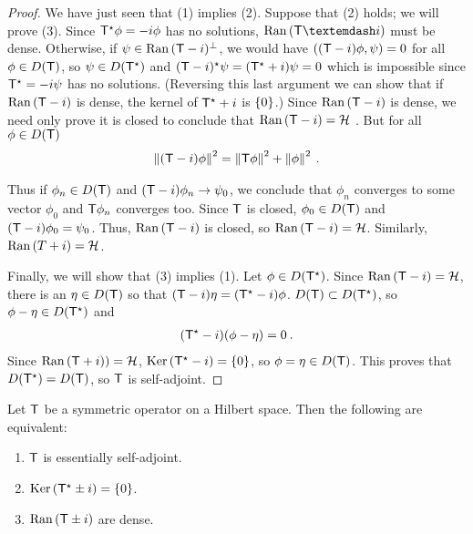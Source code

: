 \begin{proof}
We have just seen that (1) implies (2). Suppose that (2) holds; we will
prove (3). Since $\mathsf{T}^\star \phi = -i \phi$ has no solutions, $\Ran (\op T—i) $ must be dense.
Otherwise, if $\psi \in \mathrm{Ran}\, ( \mathsf{T}- i )^\bot$, we would have $((\mathsf{T}-i) \phi, \psi) =0$ for all $\phi \in D(\mathsf{T})$, so $\psi \in D(\mathsf{T}^\star)$ and $(\mathsf{T} - i)^\star \psi = (\mathsf{T}^\star + i) \psi = 0$ which is impossible since $\mathsf{T}^\star = - i \psi $ has no solutions.
(Reversing this last argument we can show that if $\mathrm{Ran}\, ( \mathsf{T} - i)$ is dense, the kernel of $\mathsf{T}^\star + i $ is $\left \lbrace 0 \right \rbrace$.) Since $\mathrm{Ran}\, ( \mathsf{T} - i)$  is dense, we need only prove it is closed to conclude that $\mathrm{Ran}\, ( \mathsf{T} - i) = \mathcal{H}$ . But for all $\phi \in D(\mathsf{T})$
\begin{align}
    \left \Vert (\mathsf{T} - i) \phi \right \Vert^2 = \left \Vert \mathsf{T} \phi \right \Vert^2 + \left \Vert \phi \right \Vert^2 \:.
\end{align}

Thus if $\phi_n \in D(\mathsf{T})$ and $(\mathsf{T} - i) \phi_n \rightarrow \psi_0$, we conclude that $\phi_n$ converges to some vector $\phi_0$ and $\mathsf{T} \phi_n$ converges too. Since $\mathsf{T}$ is closed, $\phi_0 \in D(\mathsf{T})$ and $(\mathsf{T} - i) \phi_0 = \psi_0$. Thus, $\mathrm{Ran}\,(\mathsf{T} - i)$ is closed, so $\mathrm{Ran}\, (\mathsf{T} - i) = \mathcal{H}$. Similarly, $\mathrm{Ran}\,(T+i) = \mathcal{H}$.

Finally, we will show that (3) implies (1). Let $\phi \in D(\mathsf{T}^\star)$. Since $\mathrm{Ran}\, (\mathsf{T} -i) = \mathcal{H}$, there is an $\eta \in D(\mathsf{T})$ so that $(\mathsf{T} - i) \eta = (\mathsf{T}^\star - i) \phi$. $D(\mathsf{T}) \subset D(\mathsf{T}^\star)$, so $\phi - \eta \in D(\mathsf{T}^\star)$ and \begin{align}
    (\mathsf{T}^\star - i)(\phi - \eta) = 0 \:.
\end{align}
Since $\mathrm{Ran}\,(\mathsf{T} +i) )=\mathcal{H}$, $\mathrm{Ker}\, (\mathsf{T}^\star - i) = \left \lbrace 0 \right \rbrace$, so $\phi = \eta \in D(\mathsf{T})$. This proves that $D(\mathsf{T}^\star) = D(\mathsf{T})$, so $\mathsf{T}$ is self-adjoint.

\end{proof}

\begin{corollary}
    Let $\mathsf{T}$ be a symmetric operator on a Hilbert space. Then the following are equivalent:
    \begin{enumerate}
        \item $\mathsf{T}$ is essentially self-adjoint.
        \item $\mathrm{Ker}\, (\mathsf{T}^\star \pm i) = \left \lbrace 0 \right \rbrace$.
        \item $\mathrm{Ran}\,(\mathsf{T} \pm i)$ are dense.
    \end{enumerate}
\end{corollary}

